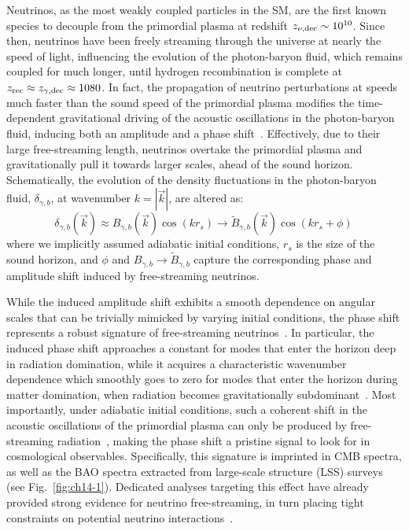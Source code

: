 \noindent Neutrinos, as the most weakly coupled particles in the SM, are the first known species to decouple from the primordial plasma at redshift $z_{\nu,\rm dec}\sim 10^{10}$. Since then, neutrinos have been freely streaming through the universe at nearly the speed of light, influencing the evolution of the photon-baryon fluid, which remains coupled for much longer, until hydrogen recombination is complete at $z_{\rm rec}\approx z_{\gamma,\rm dec}\approx1080$. In fact, the propagation of neutrino perturbations at speeds much faster than the sound speed of the primordial plasma modifies the time-dependent gravitational driving of the acoustic oscillations in the photon-baryon fluid, inducing both an amplitude and a phase shift~\cite{Bashinsky:2003tk,Baumann:2015rya}. Effectively, due to their large free-streaming length, neutrinos  overtake the primordial plasma and gravitationally pull it towards larger scales, ahead of the sound horizon. Schematically, the evolution of the density fluctuations in the photon-baryon fluid, $\delta_{\gamma,b}$, at wavenumber $k=|\vec{k}|$, are altered as:
\begin{equation}
    \delta_{\gamma,b}(\vec{k}) \approx B_{\gamma,b}(\vec{k}) \cos(k r_s) \to \tilde{B}_{\gamma,b}(\vec{k}) \cos(k r_s + \phi)\,\label{eq:ch14-phase0}
\end{equation}
where we implicitly assumed adiabatic initial conditions, $r_s$ is the size of the sound horizon, and $\phi$ and $B_{\gamma,b} \to \tilde{B}_{\gamma,b}$ capture the corresponding phase and amplitude shift induced by free-streaming neutrinos.

While the induced amplitude shift exhibits a smooth dependence on angular scales that can be trivially mimicked by varying initial conditions, the phase shift represents a robust signature of free-streaming neutrinos~\citep{Bashinsky:2003tk,Baumann:2015rya}. In particular, the induced phase shift approaches a constant for modes that enter the horizon deep in radiation domination, while it acquires a characteristic wavenumber dependence which smoothly goes to zero for modes that enter the horizon during matter domination, when
radiation becomes gravitationally subdominant~\cite{Baumann:2015rya}. Most importantly, under adiabatic initial conditions, such a coherent shift in the acoustic oscillations of the primordial plasma can only be produced by free-streaming radiation~\cite{Baumann:2015rya}, making the phase shift a pristine signal to look for in cosmological observables. Specifically, this signature is imprinted in CMB spectra, as well as the BAO spectra extracted from large-scale structure (LSS) surveys (see Fig.~\ref{fig:ch14-1}). Dedicated analyses targeting this effect have already provided strong evidence for neutrino free-streaming, in turn placing tight constraints on potential neutrino interactions~\cite{Follin:2015hya,Montefalcone:2025unv,Choi:2018gho,Whitford:2024ecj,Saravanan:2025cyi,montefalcone25}.

